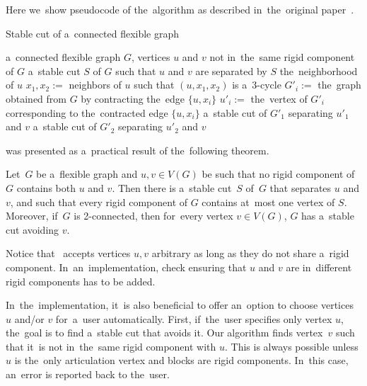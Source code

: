 Here we~show pseudocode of the~algorithm as described
in~the~original paper~\cite{stable_cuts_legersky}.
%
\begin{algorithm}[ht]
	\caption{Stable cut of a~connected flexible graph}%
	\label{alg:stable_cut_flexible}%
	\begin{algorithmic}[1]
		\Require{} a~connected flexible graph $G$, vertices $u$ and $v$ not in~the~same rigid component of $G$
		\Ensure{} a~stable cut $S$ of $G$ such that $u$ and $v$ are separated by $S$
		\State\Return{} the~neighborhood of $u$
		\Else{}
		\State{} $x_1,x_2 :={}$ neighbors of $u$ such that $(u,x_1,x_2)$  is a~$3$-cycle
		\State{} $G'_i :={}$ the~graph obtained from $G$ by contracting the~edge $\{u, x_i\}$
		\State{} $u'_i :={}$ the~vertex of $G'_i$ corresponding to the~contracted edge $\{u, x_i\}$
		\EndFor{}
		\State\Return{} a~stable cut of $G'_1$ separating $u'_1$ and $v$
		\Else{}
		\State\Return{} a~stable cut of $G'_2$ separating $u'_2$ and $v$
		\EndIf{}
		\EndIf{}
	\end{algorithmic}
\end{algorithm}
%

was presented as a~practical result of the~following theorem.
%
\begin{theorem}
	Let~\( G \) be a~flexible graph and \( u, v \in V (G) \) be such that no rigid component of \( G \)
	contains both \( u \) and \( v \). Then there is a~stable cut~\( S \) of~\( G \) that separates \( u \) and \( v \), and such that
	every rigid component of \( G \) contains at~most one vertex of \( S \). Moreover, if~\( G \) is 2-connected,
	then for~every vertex \( v \in V(G) \), \( G \) has a~stable cut avoiding \( v \).
\end{theorem}
%

Notice that~
accepts vertices \( u, v \) arbitrary as long as they do not share a~rigid component.
In~an~implementation, check ensuring that \( u \) and \( v \)
are in~different rigid components has to be added.

In~the~implementation, it~is also beneficial to offer an~option to choose
vertices \( u \) and/or \(  v \) for~a~user automatically.
First, if~the~user specifies only vertex \( u \), the~goal is to find a~stable cut
that avoids it. Our algorithm finds vertex~\( v \)
such that it~is not in~the~same rigid component with \( u \).
This is always possible unless \( u \) is the~only articulation vertex
and blocks are rigid components. In~this case, an~error is reported back to the~user.


